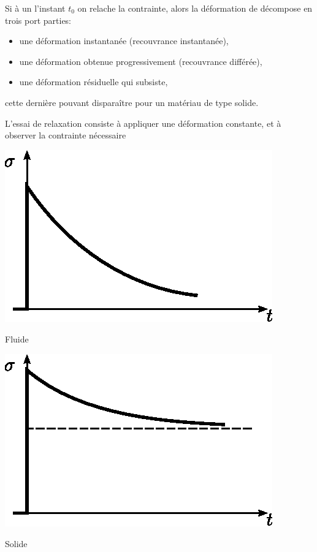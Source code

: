 Si à un l'instant $t_0$ on relache la contrainte, alors la déformation de décompose en trois port parties:
\begin{itemize}
    \item une déformation instantanée (recouvrance instantanée),
    \item une déformation obtenue progressivement (recouvrance différée),
    \item une déformation résiduelle qui subsiste,
\end{itemize}
cette dernière pouvant disparaître pour un matériau de type solide.

L'essai de relaxation consiste à appliquer une déformation constante, et à observer la contrainte nécessaire
\begin{multicols}{2}
    \begin{center}
        \includegraphics{../images/T1_Ch04-0019}

        Fluide
    \end{center}
    \columnbreak
    \begin{center}
        \includegraphics{../images/T1_Ch04-0020}

        Solide
    \end{center}
\end{multicols}

